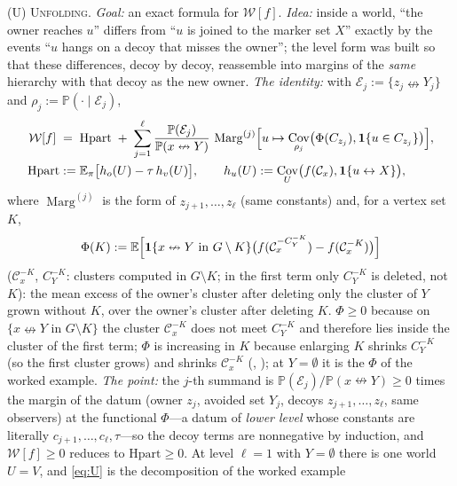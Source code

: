 \documentclass[11pt]{article}
\theoremstyle{definition}
\theoremstyle{remark}
\newcommand{\PP}{\mathbb{P}}
\newcommand{\E}{\mathbb{E}}
\DeclareMathOperator{\Cov}{Cov}
\newcommand{\con}{\leftrightarrow}
\newcommand{\ncon}{\nleftrightarrow}
\newcommand{\one}{\mathbf 1}
\newcommand{\eC}{\mathcal{C}}
\newcommand{\Marg}{\operatorname{Marg}}
\begin{document}
 \textsc{(U) Unfolding.}  \emph{Goal:} an exact formula for $\mathcal W[f]$.  \emph{Idea:} inside a world, ``the owner reaches $u$'' differs from
``$u$ is joined to the marker set $X$'' exactly by the events ``$u$ hangs on a decoy that misses the owner''; the level form was built so that these
differences, decoy by decoy, reassemble into margins of the \emph{same} hierarchy with that decoy as the new owner.  \emph{The identity:} with
$\mathcal E_j:=\{z_j\ncon Y_j\}$ and $\rho_j:=\PP(\cdot\mid\mathcal E_j)$,
\begin{equation}\label{eq:U}
\begin{split}
 \mathcal W[f]\;&=\;\mathrm{Hpart}\;+\;\sum_{j=1}^{\ell}\frac{\PP(\mathcal E_j)}{\PP(x\ncon Y)}\,
   \Marg^{(j)}\Bigl[u\mapsto\Cov_{\rho_j}\bigl(\Phi(C_{z_j}),\one\{u\in C_{z_j}\}\bigr)\Bigr],\\
 \mathrm{Hpart}&:=\E_\pi\bigl[h_o(U)-\tau\,h_v(U)\bigr],\qquad h_u(U):=\Cov_U\bigl(f(\eC_x),\one\{u\con X\}\bigr),
\end{split}
\end{equation}
where $\Marg^{(j)}$ is the form of $z_{j+1},\dots,z_\ell$ (same constants) and, for a vertex set $K$,
\begin{equation}\label{eq:Phi}
 \Phi(K):=\E\Bigl[\one\{x\ncon Y\text{ in }G\setminus K\}\bigl(f(\eC_x^{-C_Y^{-K}})-f(\eC_x^{-K})\bigr)\Bigr]
\end{equation}
($\eC_x^{-K}$, $C_Y^{-K}$: clusters computed in $G\setminus K$; in the first term only $C_Y^{-K}$ is deleted, not $K$): the mean excess of the
owner's cluster after deleting only the cluster of $Y$ grown without $K$, over the owner's cluster after deleting $K$.  $\Phi\ge0$ because on
$\{x\ncon Y$ in $G\setminus K\}$ the cluster $\eC_x^{-K}$ does not meet $C_Y^{-K}$ and therefore lies inside the cluster of the first term; $\Phi$ is increasing
in $K$ because enlarging $K$ shrinks $C_Y^{-K}$ (so the first cluster grows) and shrinks $\eC_x^{-K}$ (, ); at
$Y=\emptyset$ it is the $\Phi$ of the worked example.  \emph{The point:} the $j$-th summand is $\PP(\mathcal E_j)/\PP(x\ncon Y)\ge0$
times the margin of the datum (owner $z_j$, avoided set $Y_j$, decoys $z_{j+1},\dots,z_\ell$, same observers) at the functional $\Phi$---a datum of
\emph{lower level} whose constants are literally $c_{j+1},\dots,c_\ell,\tau$---so the decoy terms are nonnegative by induction, and $\mathcal W[f]\ge0$
reduces to $\mathrm{Hpart}\ge0$.  At level $\ell=1$ with $Y=\emptyset$ there is one world $U=V$, and \eqref{eq:U} is the decomposition of the worked example
\end{document}
